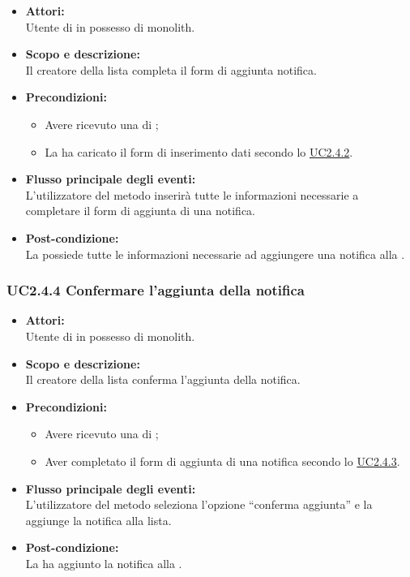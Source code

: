 \begin{itemize}
	\item \textbf{Attori:}
	\\Utente di  in possesso di monolith.
	\item \textbf{Scopo e descrizione:} 
	\\Il creatore della lista completa il form di aggiunta notifica.
	\item \textbf{Precondizioni:}
	\begin{itemize}
		\item Avere ricevuto una  di ;
		\item La  ha caricato il form di inserimento dati secondo lo \hyperref[UC2.4.2]{UC2.4.2}.
	\end{itemize}
	\item \textbf{Flusso principale degli eventi:}
	\\L'utilizzatore del metodo inserirà tutte le informazioni necessarie a completare il form di aggiunta di una notifica.
	\item \textbf{Post-condizione:}
	\\La {} possiede tutte le informazioni necessarie ad aggiungere una notifica alla .
\end{itemize}

\subsubsection{UC2.4.4 Confermare l'aggiunta della notifica} \label{UC2.4.4}

\begin{itemize}
	\item \textbf{Attori:}
	\\Utente di  in possesso di monolith.
	\item \textbf{Scopo e descrizione:} 
	\\Il creatore della lista conferma l'aggiunta della notifica.
	\item \textbf{Precondizioni:}
	\begin{itemize}
		\item Avere ricevuto una  di ;
		\item Aver completato il form di aggiunta di una notifica secondo lo \hyperref[UC2.4.3]{UC2.4.3}.
	\end{itemize}
	\item \textbf{Flusso principale degli eventi:}
	\\L'utilizzatore del metodo seleziona l'opzione “conferma aggiunta” e la  aggiunge la notifica alla lista.
	\item \textbf{Post-condizione:}
	\\La {} ha aggiunto la notifica alla .
\end{itemize}


